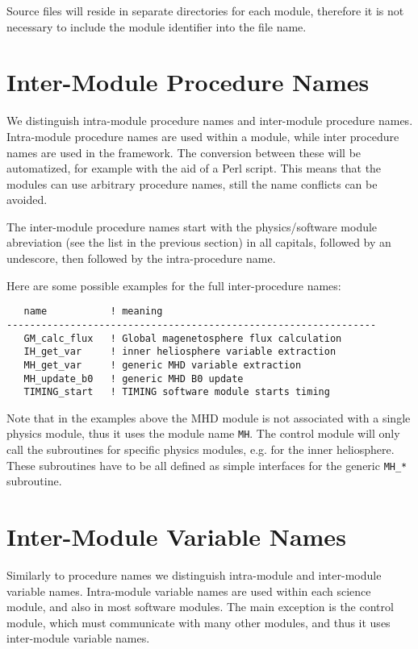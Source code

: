 Source files will reside in separate directories for each
module, therefore it is not necessary to include the
module identifier into the file name.

\section{Inter-Module Procedure Names}

We distinguish intra-module procedure names and inter-module 
procedure names. Intra-module procedure names are used within a module,
while inter procedure names are used in the framework.
The conversion between these will be automatized, for example with 
the aid of a Perl script. This means that the modules can use 
arbitrary procedure names, still the name conflicts can be avoided. 

The inter-module procedure names start with the physics/software module 
abreviation (see the list in the previous section) 
in all capitals, followed by an undescore, then followed by the
intra-procedure name. 

Here are some possible examples for the full inter-procedure names:
\begin{verbatim}
   name           ! meaning
----------------------------------------------------------------
   GM_calc_flux   ! Global magenetosphere flux calculation
   IH_get_var     ! inner heliosphere variable extraction
   MH_get_var     ! generic MHD variable extraction
   MH_update_b0   ! generic MHD B0 update
   TIMING_start   ! TIMING software module starts timing
\end{verbatim}
Note that in the examples above the MHD module is not associated with 
a single physics module, thus it uses the module name {\tt MH}.
The control module will only call the subroutines for specific 
physics modules, e.g. for the inner heliosphere. These subroutines
have to be all defined as simple interfaces for the
generic {\tt MH\_*} subroutine.

\section{Inter-Module Variable Names}

Similarly to procedure names we distinguish intra-module and
inter-module variable names. Intra-module variable names 
are used within each science module, and also in most software
modules. The main exception is the control module, which must
communicate with many other modules, and thus it uses 
inter-module variable names.

